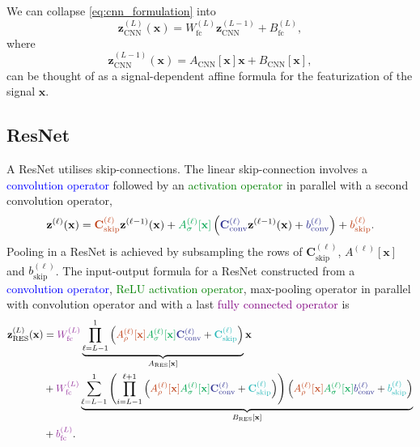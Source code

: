 We can collapse \eqref{eq:cnn_formulation} into 
\begin{equation}\label{eq:collapse_of_cnn_formulation}
    \mathbf{z}^{(L)}_{\text{CNN}}(\mathbf{x})=W_{\text{fc}}^{(L)}\mathbf{z}_{\text{CNN}}^{(L-1)}+B_{\text{fc}}^{(L)},
\end{equation}
where $$\mathbf{z}_{\text{CNN}}^{(L-1)}(\mathbf{x})=A_{\text{CNN}}[\mathbf{x}]\mathbf{x}+B_{\text{CNN}}[\mathbf{x}],$$can be thought of as a signal-dependent affine formula for the featurization of the signal $\mathbf{x}$.

\subsection{ResNet}\label{subsec:resnet}

A ResNet utilises skip-connections. The linear skip-connection involves a \textcolor{Blue}{convolution operator} followed by an \textcolor{Green}{activation operator} in parallel with a second \textcolor{Bittersweet}{convolution operator}, $$\mathbf{z}^{(\ell)}(\mathbf{x})=\textcolor{Bittersweet}{\mathbf{C}_{\text{skip}}^{(\ell)}}\mathbf{z}^{(\ell-1)}(\mathbf{x})+\textcolor{Green}{A_{\sigma}^{(\ell)}[\mathbf{x}]}\left(\textcolor{Blue}{\mathbf{C}_{\text{conv}}^{(\ell)}}\mathbf{z}^{(\ell-1)}(\mathbf{x})+\textcolor{Blue}{b_{\text{conv}}^{(\ell)}}\right)+\textcolor{Bittersweet}{b_{\text{skip}}^{(\ell)}}.$$Pooling in a ResNet is achieved by subsampling the rows of $\mathbf{C}_{\text{skip}}^{(\ell)}$, $A^{(\ell)}[\mathbf{x}]$ and $b_{\text{skip}}^{(\ell)}$. The input-output formula for a ResNet constructed from a \textcolor{Blue}{convolution operator}, \textcolor{Green}{ReLU activation operator}, \textcolor{Bittersweet}{max-pooling operator} in parallel with \textcolor{BlueGreen}{convolution operator} and with a last \textcolor{Purple}{fully connected operator} is 
\begin{align}\label{eq:resnet_formulation}
    \mathbf{z}_{\text{RES}}^{(L)}(\mathbf{x})&=\textcolor{Purple}{W_{\text{fc}}^{(L)}}\underbrace{\prod_{\ell=L-1}^1\left(\textcolor{Bittersweet}{A_{\rho}^{(\ell)}[\mathbf{x}]}\textcolor{Green}{A_{\sigma}^{(\ell)}[\mathbf{x}]}\textcolor{Blue}{\mathbf{C}_{\text{conv}}^{(\ell)}}+\textcolor{BlueGreen}{\mathbf{C}^{(\ell)}_{\text{skip}}}\right)}_{A_{\text{RES}}[\mathbf{x}]}\mathbf{x}\nonumber\\&+\textcolor{Purple}{W_{\text{fc}}^{(L)}}\underbrace{\sum_{\ell=L-1}^1\left(\prod_{i=L-1}^{\ell+1}\left(\textcolor{Bittersweet}{A_{\rho}^{(\ell)}[\mathbf{x}]}\textcolor{Green}{A_{\sigma}^{(\ell)}[\mathbf{x}]}\textcolor{Blue}{\mathbf{C}_{\text{conv}}^{(\ell)}}+\textcolor{BlueGreen}{\mathbf{C}_{\text{skip}}^{(\ell)}}\right)\right)\left(\textcolor{Bittersweet}{A_{\rho}^{(\ell)}[\mathbf{x}]}\textcolor{Green}{A_{\sigma}^{(\ell)}[\mathbf{x}]}\textcolor{Blue}{b_{\text{conv}}^{(\ell)}}+\textcolor{BlueGreen}{b_{\text{skip}}^{(\ell)}}\right)}_{B_{\text{RES}}[\mathbf{x}]}\nonumber\\&+\textcolor{Purple}{b_{\text{fc}}^{(L)}}.
\end{align}
